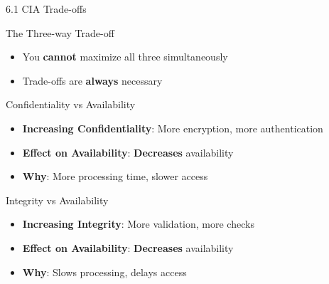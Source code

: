 \documentclass{beamer}
\begin{document}
	\begin{frame}{6.1 CIA Trade-offs}
		\begin{block}{The Three-way Trade-off}
			\begin{itemize}
				\item You \textbf{cannot} maximize all three simultaneously
				\item Trade-offs are \textbf{always} necessary
			\end{itemize}
		\end{block}
		
		\begin{block}{Confidentiality vs Availability}
			\begin{itemize}
				\item \textbf{Increasing Confidentiality}: More encryption, more authentication
				\item \textbf{Effect on Availability}: \textbf{Decreases} availability
				\item \textbf{Why}: More processing time, slower access
			\end{itemize}
		\end{block}
		
		\begin{block}{Integrity vs Availability}
			\begin{itemize}
				\item \textbf{Increasing Integrity}: More validation, more checks
				\item \textbf{Effect on Availability}: \textbf{Decreases} availability
				\item \textbf{Why}: Slows processing, delays access
			\end{itemize}
		\end{block}
	\end{frame}
	
\end{document}
